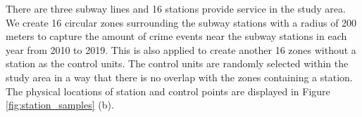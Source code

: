 \documentclass[a4paper, 11pt]{article}
\begin{document}
There are three subway lines and 16 stations provide service in the study area. We create 16 circular zones surrounding the subway stations with a radius of 200 meters to capture the amount of crime events near the subway stations in each year from 2010 to 2019. This is also applied to create another 16 zones without a station as the control units. The control units are randomly selected within the study area in a way that there is no overlap with the zones containing a station. The physical locations of station and control points are displayed in Figure \ref{fig:station_samples} (b).

\begin{figure}%
\hfill
{}
\hfill

\end{figure}
\end{document}
